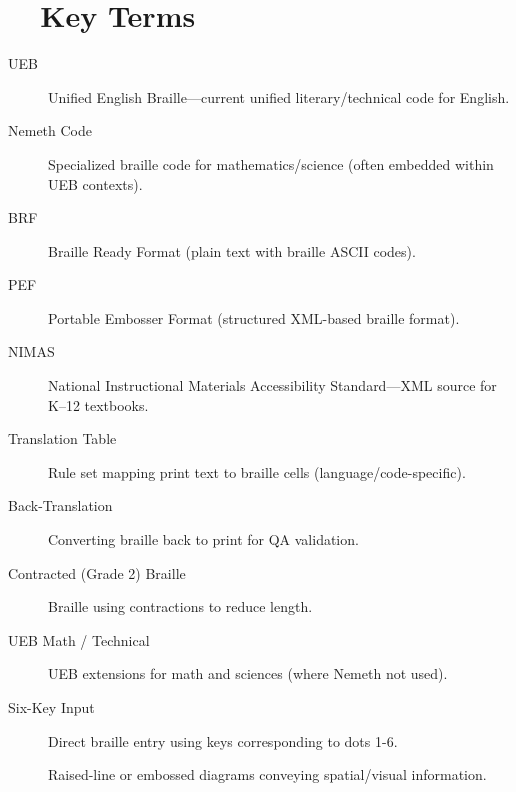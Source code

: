 \section{~~Key Terms}
\label{sec:braille-key-terms}
\begin{description}
	\item[UEB]  Unified English Braille—current unified literary/technical code for English.
	\item[Nemeth Code]  Specialized braille code for mathematics/science (often embedded within UEB contexts).
	\item[BRF]  Braille Ready Format (plain text with braille ASCII codes).
	\item[PEF]  Portable Embosser Format (structured XML-based braille format).
	\item[NIMAS]  National Instructional Materials Accessibility Standard—XML source for K–12 textbooks.
	\item[Translation Table]  Rule set mapping print text to braille cells (language/code-specific).
	\item[Back-Translation]  Converting braille back to print for QA validation.
	\item[Contracted (Grade 2) Braille]  Braille using contractions to reduce length.
	\item[UEB Math / Technical]  UEB extensions for math and sciences (where Nemeth not used).
	\item[Six-Key Input]  Direct braille entry using keys corresponding to dots 1-6.
	\item[]  Raised-line or embossed diagrams conveying spatial/visual information.
\end{description}

